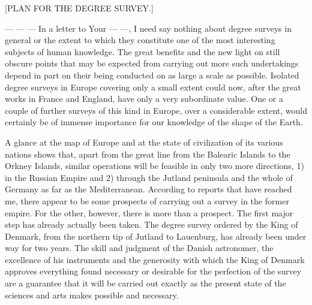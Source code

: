 \par{}\bigskip
{}%
\begin{center}\large [PLAN FOR THE DEGREE SURVEY.]\end{center}
\par
— — — In a letter to Your — —, I need say nothing about degree surveys in general or the extent to which they constitute one of the most interesting subjects of human knowledge. The great benefits and the new light on still obscure points that may be expected from carrying out more such undertakings depend in part on their being conducted on as large a scale as possible. Isolated degree surveys in Europe covering only a small extent could now, after the great works in France and England, have only a very subordinate value. One or a couple of further surveys of this kind in Europe, over a considerable extent, would certainly be of immense importance for our knowledge of the shape of the Earth.

A glance at the map of Europe and at the state of civilization of its various nations shows that, apart from the great line from the Balearic Islands to the Orkney Islands, similar operations will be feasible in only two more directions, 1) in the Russian Empire and 2) through the Jutland peninsula and the whole of Germany as far as the Mediterranean. According to reports that have reached me, there appear to be some prospects of carrying out a survey in the former empire. For the other, however, there is more than a prospect. The first major step has already actually been taken. The degree survey ordered by the King of Denmark, from the northern tip of Jutland to Lauenburg, has already been under way for two years. The skill and judgment of the Danish astronomer, the excellence of his instruments and the generosity with which the King of Denmark approves everything found necessary or desirable for the perfection of the survey are a guarantee that it will be carried out exactly as the present state of the sciences and arts makes possible and necessary.

